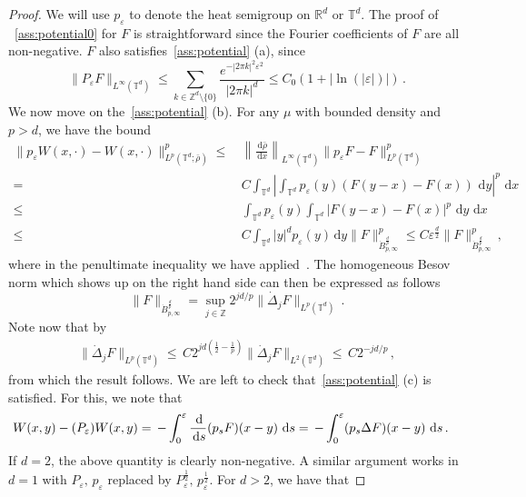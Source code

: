 \documentclass[a4paper,10pt,twoside]{amsart}
\newcommand{\dx}[1]{\,\mathrm{d}#1}  %
\theoremstyle{remark}
\theoremstyle{definition}
\numberwithin{equation}{section}
\newcommand{\T}{\mathbb{T}}
\newcommand{\eps}{\varepsilon}
\newcommand{\R}{\mathbb{R}}
\newcommand{\Z}{\mathbb{Z}}
\newcommand{\0}{{\bf 0}}
\newcommand{\+}{\hspace{-.5ex}+\hspace{-.5ex}}
\begin{document}
\begin{proof}
 We will use $p_\eps$ to denote the heat semigroup on $\R^d$ or $\T^d$. The proof of ~\cref{ass:potential0} for $F$ is straightforward since the Fourier coefficients of $F$ are all non-negative. $F$ also satisfies~\cref{ass:potential} (a), since
  \begin{equation}
    \lVert P_\eps F \rVert_{L^\infty(\T^d)} \leq \sum_{k \in \Z^d \setminus \{0\}}\frac{e^{-|2\pi k|^2 \eps^2}}{|2 \pi k|^d} \leq C_0 (1 + |\ln (|\eps|)|)\, .
  \end{equation}
  We now move on the~\cref{ass:potential} (b). For any $\mu$ with bounded density and $p>d$, we have the bound
  \begin{align}
    \lVert p_\eps W(x,\cdot) - W(x,\cdot) \rVert_{L^p(\T^d;\bar{\rho})}^p \leq & \, \left\lVert \frac{\dx{\bar{\rho}}}{\dx{x}}\right \rVert_{L^\infty(\T^d)} \lVert p_\eps F - F \rVert_{L^p(\T^d)}^p \\
    =& \, C \int_{\T^d}\left | \int_{\T^d} p_\eps(y)(F(y-x)-F(x)) \, \dx{y}\right|^p \, \dx{x}\\
    \leq & \,\int_{\T^d}p_\eps(y) \int_{\T^d} |F(y-x)-F(x)|^p \, \dx{y} \, \dx{x}\\
    \leq & \, C \int_{\T^d}|y|^{ d}p_\eps(y)\dx{y} \lVert F\rVert_{\dot{B}_{p,\infty}^{\frac{d}{p}}}^p  \leq C \eps^{\frac{d}{2}}\lVert F\rVert_{\dot{B}_{p,\infty}^{\frac{d}{p}}}^p\, ,
  \end{align}
  where in the penultimate inequality we have applied~\cite[Theorem 2.36]{BCD11}. The homogeneous Besov norm  which shows up on the right hand side can then be expressed as follows
  \begin{equation}
    \lVert F\rVert_{\dot{B}_{p,\infty}^{\frac{d}{p}}} = \sup_{j \in \Z} 2^{jd/p} \lVert \dot{\Delta}_j F \rVert_{L^p(\T^d)}\, .
  \end{equation}
   Note now that by~\cite[Lemma 2.1]{BCD11}
  \begin{align}
    \lVert \dot{\Delta}_j F \rVert_{L^p(\T^d)} \leq \, C 2^{j d(\frac{1}{2}-\frac1p)} \lVert \dot{\Delta}_j F \rVert_{L^2(\T^d)} \leq  \, C2^{-jd/p} \, ,
  \end{align}
  from which the result follows. We are left to check that~\cref{ass:potential} (c) is satisfied. For this, we note that
  \begin{align}
       &W(x,y)-(P_\eps)W(x,y)=\, -\int_0^\eps \frac{\dx}{\dx{s}}(p_sF)(x-y)\, \dx{s} =\,  -\int_0^\eps (p_s\Delta F)(x-y)\, \dx{s}\, .
  \end{align}
  If $d=2$, the above quantity is clearly non-negative. A similar argument works in $d=1$ with $P_\eps,\,p_\eps$ replaced by $P_\eps^{\frac12},\,p_\eps^{\frac12}$. For $d>2$, we have that 

\end{proof}
\end{document}
